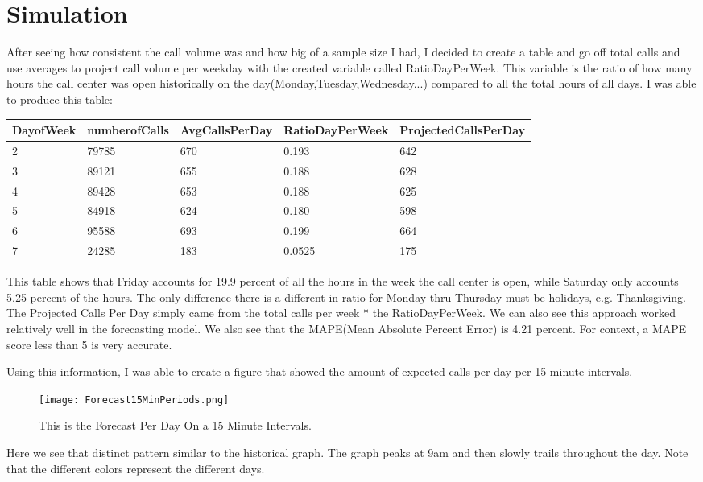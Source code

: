 \documentclass[12pt]{article}
\begin{document}
\section*{Simulation}
After seeing how consistent the call volume was and how big of a sample size I had, I decided to create a table and go off total calls and use averages to project call volume per weekday with the 
created variable called RatioDayPerWeek. This variable is the ratio of how many hours the call center was open historically on the day(Monday,Tuesday,Wednesday...) compared to all the total hours of all days.
I was able to produce this table:
\begin{table}[H]
  \resizebox{\textwidth}{!} {
  \begin{tabular}{ l | l | l | l | l |}
    {\bf DayofWeek} & {\bf numberofCalls} & {\bf AvgCallsPerDay} & {\bf RatioDayPerWeek} & {\bf ProjectedCallsPerDay} \\
  \hline
  2 & 79785 & 670 & 0.193 & 642 \\
  \hline
  3 & 89121 & 655 & 0.188 & 628 \\
  \hline
  4 & 89428 & 653 & 0.188 & 625 \\
  \hline
  5 & 84918 & 624 & 0.180 & 598 \\
  \hline
  6 & 95588 & 693 & 0.199 & 664 \\
  \hline
  7 & 24285 & 183 & 0.0525 & 175\\
  \end{tabular}
  }
  \end{table}
This table shows that Friday accounts for 19.9 percent of all the hours in the week the call center is open, while Saturday only accounts
5.25 percent of the hours. The only difference there is a different in ratio for Monday thru Thursday must be holidays, e.g. Thanksgiving. 
The Projected Calls Per Day simply came from the total calls per week * the RatioDayPerWeek. We can also see this approach worked relatively well in the forecasting model. 
We also see that the MAPE(Mean Absolute Percent Error) is 4.21 percent. For context, a MAPE score less than 5 is very accurate.

  Using this information, I was able to create a figure that showed the amount of expected calls per day per 15 minute intervals. 
  \begin{figure}[H]
    \centering
    \texttt{[image: Forecast15MinPeriods.png]}
    \caption{This is the Forecast Per Day On a 15 Minute Intervals.}
    \label{fig:Forecast}
  \end{figure}
Here we see that distinct pattern similar to the historical graph. The graph peaks at 9am and then slowly trails throughout the day.
Note that the different colors represent the different days.
\end{document}
